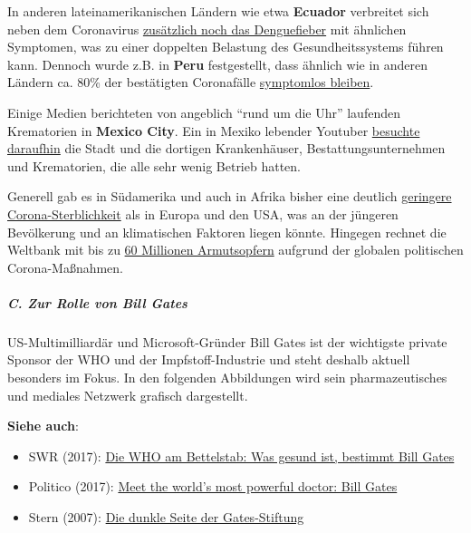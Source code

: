 In anderen lateinamerikanischen Ländern wie etwa \textbf{Ecuador}
verbreitet sich neben dem Coronavirus
\href{https://www.bbc.com/mundo/noticias-america-latina-52383340}{zusätzlich
noch das Denguefieber} mit ähnlichen Symptomen, was zu einer doppelten
Belastung des Gesundheitssystems führen kann. Dennoch wurde z.B. in
\textbf{Peru} festgestellt, dass ähnlich wie in anderen Ländern ca. 80\%
der bestätigten Coronafälle
\href{https://exitosanoticias.pe/v1/covid-19-minsa-el-80-de-casos-confirmados-en-el-peru-son-asintomaticos/}{symptomlos
bleiben}.

Einige Medien berichteten von angeblich ``rund um die Uhr'' laufenden
Krematorien in \textbf{Mexico City}. Ein in Mexiko lebender Youtuber
\href{https://www.youtube.com/watch?v=_vQhwEZpDPE}{besuchte daraufhin}
die Stadt und die dortigen Krankenhäuser, Bestattungs­­unternehmen und
Krematorien, die alle sehr wenig Betrieb hatten.

Generell gab es in Südamerika und auch in Afrika bisher eine deutlich
\href{https://www.msn.com/en-gb/news/world/coronavirus-why-africa-seems-to-have-few-cases/ar-BB10MNJd}{geringere
Corona-Sterblichkeit} als in Europa und den USA, was an der jüngeren
Bevölkerung und an klimatischen Faktoren liegen könnte. Hingegen rechnet
die Weltbank mit bis zu
\href{https://www.deccanherald.com/business/economy-business/world-bank-says-covid-19-to-push-60-million-into-poverty-announces-usd-160-billion-assistance-to-100-countries-839661.html}{60
Millionen Armutsopfern} aufgrund der globalen politischen
Corona-Maßnahmen.

\hypertarget{c-zur-rolle-von-bill-gates}{%
\subparagraph{\texorpdfstring{\textbf{C. Zur Rolle von Bill
Gates}}{C. Zur Rolle von Bill Gates}}\label{c-zur-rolle-von-bill-gates}}

US-Multimilliardär und Microsoft-Gründer Bill Gates ist der wichtigste
private Sponsor der WHO und der Impfstoff-Industrie und steht deshalb
aktuell besonders im Fokus. In den folgenden Abbildungen wird sein
pharmazeutisches und mediales Netzwerk grafisch dargestellt.

\textbf{Siehe auch}:

\begin{itemize}
\tightlist
\item
  SWR (2017):
  \href{https://www.swr.de/swr2/wissen/who-am-bettelstab-was-gesund-ist-bestimmt-bill-gates-100.html}{Die
  WHO am Bettelstab: Was gesund ist, bestimmt Bill Gates}
\item
  Politico (2017):
  \href{https://www.politico.eu/article/bill-gates-who-most-powerful-doctor/}{Meet
  the world's most powerful doctor: Bill Gates}
\item
  Stern (2007):
  \href{https://www.stern.de/wirtschaft/news/investitionen-die-dunkle-seite-der-gates-stiftung-3330702.html}{Die
  dunkle Seite der Gates-Stiftung}
\end{itemize}

